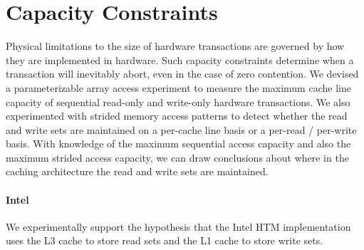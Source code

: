\section{Capacity Constraints}
\label{sec:capacity}
Physical limitations to the size of hardware 
transactions are
governed by how they are implemented in hardware. 
Such capacity constraints
determine when a transaction will inevitably abort, 
even in the case of zero contention. We 
devised a parameterizable array access
experiment to measure the maximum cache line capacity 
of sequential read-only and write-only
hardware transactions. We also experimented with strided 
memory access patterns
to detect whether the read and write sets are maintained
on a per-cache line basis or a per-read / per-write basis.
With knowledge of the maximum sequential access 
capacity and also the maximum
strided access capacity, we can draw conclusions 
about where in the caching
architecture the read and write sets are 
maintained. 

\paragraph{Intel}
We experimentally support the hypothesis
that the Intel HTM implementation uses the L3 cache to 
store read sets and the L1 cache to store write sets.

